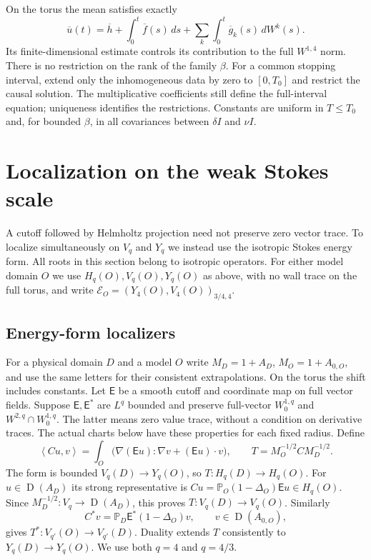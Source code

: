 \documentclass[11pt]{article}
\numberwithin{equation}{section}
\theoremstyle{remark}
\newcommand{\PP}{\mathbb P}
\newcommand{\calE}{\mathcal E}
\newcommand{\ip}[2]{\left\langle#1,#2\right\rangle}
\DeclareMathOperator{\Dom}{D}
\begin{document}
On the torus the mean satisfies exactly
\[
 \overline u(t)=\overline h+\int_0^t\overline f(s)\,ds
 +\sum_k\int_0^t\overline g_k(s)\,dW^k(s).
\]
Its finite-dimensional estimate controls its contribution to the full
$W^{1,4}$ norm. There is no restriction on the rank of the family
$\beta$. For a common stopping interval, extend only the inhomogeneous
data by zero to $[0,T_0]$ and restrict the causal solution. The
multiplicative coefficients still define the full-interval equation;
uniqueness identifies the restrictions. Constants are uniform in
$T\leq T_0$ and, for bounded $\beta$, in all covariances between
$\delta I$ and $\nu I$.

\section{Localization on the weak Stokes scale}\label{sec:localization}

A cutoff followed by Helmholtz projection need not preserve zero vector
trace. To localize simultaneously on $V_q$ and $Y_q$ we instead use
the isotropic Stokes energy form. All roots in this section belong
to isotropic operators. For either model domain $O$ we use
$H_q(O),V_q(O),Y_q(O)$ as above, with no wall trace on the full
torus, and write $\calE_O=(Y_4(O),V_4(O))_{3/4,4}$.

\subsection{Energy-form localizers}\label{sec:energy-localizers}

For a physical domain $D$ and a model $O$ write $M_D=1+A_D$,
$M_O=1+A_{0,O}$, and use the same letters for their consistent
extrapolations. On the torus the shift includes constants. Let
$\mathsf E$ be a smooth cutoff and coordinate map on full vector
fields. Suppose $\mathsf E,\mathsf E^*$ are $L^q$ bounded and
preserve full-vector $W^{1,q}_0$ and $W^{2,q}\cap W^{1,q}_0$.
The latter means zero value trace, without a condition on derivative
traces. The actual charts below have these properties for each fixed
radius. Define
\begin{equation}\label{eq:cross-form}
 \ip{Cu}{v}=\int_O\bigl(\nabla(\mathsf E u):\nabla v
 +(\mathsf E u)\cdot v\bigr),\qquad
 T=M_O^{-1/2}CM_D^{-1/2}.
\end{equation}
The form is bounded $V_q(D)\to Y_q(O)$, so $T:H_q(D)\to H_q(O)$.
For $u\in\Dom(A_D)$ its strong representative is
$Cu=\PP_O(1-\Delta_O)\mathsf E u\in H_q(O)$. Since
$M_D^{-1/2}:V_q\to\Dom(A_D)$, this proves $T:V_q(D)\to V_q(O)$.
Similarly
\[
 C^*v=\PP_D\mathsf E^*(1-\Delta_O)v,
 \qquad v\in\Dom(A_{0,O}),
\]
gives $T^*:V_{q'}(O)\to V_{q'}(D)$. Duality extends $T$ consistently
to $Y_q(D)\to Y_q(O)$. We use both $q=4$ and $q=4/3$.
\end{document}
